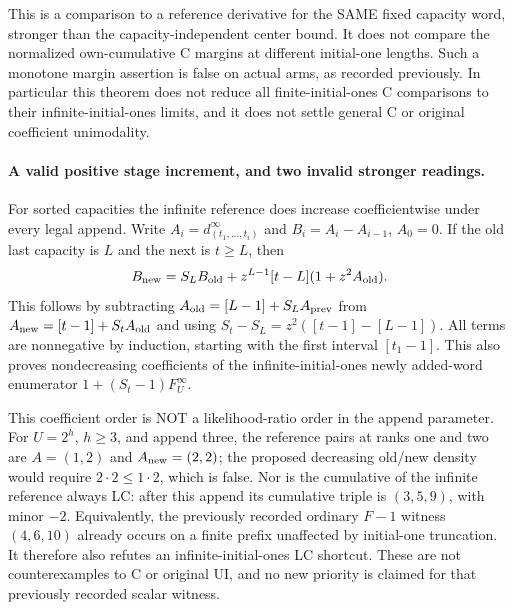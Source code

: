 This is a comparison to a reference derivative for the SAME
fixed capacity word, stronger than the capacity-independent
center bound. It does not compare the normalized own-cumulative
C margins at different initial-one lengths. Such a monotone
margin assertion is false on actual arms, as recorded previously.
In particular this theorem does not reduce all finite-initial-ones
C comparisons to their infinite-initial-ones limits, and it does
not settle general C or original coefficient unimodality.

\paragraph{A valid positive stage increment, and two invalid stronger readings.}
For sorted capacities the infinite reference does increase
coefficientwise under every legal append. Write
$A_i=d^\infty_{(t_1,\ldots,t_i)}$ and
$B_i=A_i-A_{i-1}$, $A_0=0$.
If the old last capacity is $L$ and the next is $t\ge L$, then
\[
 B_{\rm new}=S_LB_{\rm old}
       +z^{L-1}[t-L](1+z^2A_{\rm old}).
\]
This follows by subtracting
$A_{\rm old}=[L-1]+S_LA_{\rm prev}$ from
$A_{\rm new}=[t-1]+S_tA_{\rm old}$ and using
$S_t-S_L=z^2([t-1]-[L-1])$.
All terms are nonnegative by induction, starting with the
first interval $[t_1-1]$. This also proves nondecreasing
coefficients of the infinite-initial-ones newly added-word
enumerator $1+(S_t-1)F^\infty_U$.

This coefficient order is NOT a likelihood-ratio order in
the append parameter. For $U=2^h$, $h\ge3$, and append three,
the reference pairs at ranks one and two are
$A=(1,2)$ and $A_{\rm new}=(2,2)$; the proposed decreasing
old/new density would require $2\cdot2\le1\cdot2$, which is false.
Nor is the cumulative of the infinite reference always LC:
after this append its cumulative triple is $(3,5,9)$, with
minor $-2$. Equivalently, the previously recorded ordinary
$F-1$ witness $(4,6,10)$ already occurs on a finite prefix
unaffected by initial-one truncation. It therefore also
refutes an infinite-initial-ones LC shortcut. These are not
counterexamples to C or original UI, and no new priority is
claimed for that previously recorded scalar witness.
